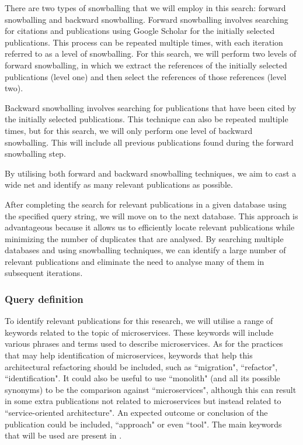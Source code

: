 There are two types of snowballing that we will employ in this search: forward
snowballing and backward snowballing. Forward snowballing involves searching
for citations and publications using Google Scholar for the initially selected
publications. This process can be repeated multiple times, with each iteration
referred to as a level of snowballing. For this search, we will
perform two levels of forward snowballing, in which we extract the references
of the initially selected publications (level one) and then select the
references of those references (level two).

Backward snowballing involves searching for publications that have been cited
by the initially selected publications. This technique can also be repeated
multiple times, but for this search, we will only perform one
level of backward snowballing. This will include all previous publications
found during the forward snowballing step.

By utilising both forward and backward snowballing techniques, we aim to cast a
wide net and identify as many relevant publications as possible.

After completing the search for relevant publications in a given database using
the specified query string, we will move on to the next database. This approach
is advantageous because it allows us to efficiently locate relevant
publications while minimizing the number of duplicates that are analysed. By
searching multiple databases and using snowballing techniques, we can identify
a large number of relevant publications and eliminate the need to analyse many
of them in subsequent iterations.

\subsubsection{Query definition}

To identify relevant publications for this research, we will utilise a range of
keywords related to the topic of microservices. These keywords will include
various phrases and terms used to describe microservices. As for the practices
that may help identification of microservices, keywords that help this
architectural refactoring should be included, such as ``migration",
``refactor", ``identification". It could also be useful to use ``monolith" (and
all its possible synonyms) to be the comparison against ``microservices",
although this can result in some extra publications not related to
microservices but instead related to ``service-oriented architecture". An
expected outcome or conclusion of the publication could be included,
``approach" or even ``tool". The main keywords that will be used are present in
.

